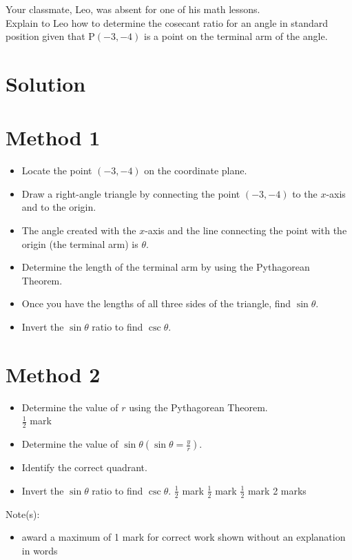 \documentclass[10pt]{article}
\begin{document}
Your classmate, Leo, was absent for one of his math lessons.\\
Explain to Leo how to determine the cosecant ratio for an angle in standard position given that $\mathrm{P}(-3,-4)$ is a point on the terminal arm of the angle.

\section*{Solution}
\section*{Method 1}
\begin{itemize}
  \item Locate the point $(-3,-4)$ on the coordinate plane.
  \item Draw a right-angle triangle by connecting the point $(-3,-4)$ to the $x$-axis and to the origin.
  \item The angle created with the $x$-axis and the line connecting the point with the origin (the terminal arm) is $\theta$.
  \item Determine the length of the terminal arm by using the Pythagorean Theorem.
  \item Once you have the lengths of all three sides of the triangle, find $\sin \theta$.
  \item Invert the $\sin \theta$ ratio to find $\csc \theta$.
\end{itemize}

\section*{Method 2}
\begin{itemize}
  \item Determine the value of $r$ using the Pythagorean Theorem.\\
$\frac{1}{2}$ mark
  \item Determine the value of $\sin \theta\left(\sin \theta=\frac{y}{r}\right)$.
  \item Identify the correct quadrant.
  \item Invert the $\sin \theta$ ratio to find $\csc \theta$. $\frac{1}{2}$ mark $\frac{1}{2}$ mark $\frac{1}{2}$ mark 2 marks
\end{itemize}

Note(s):

\begin{itemize}
  \item award a maximum of 1 mark for correct work shown without an explanation in words
\end{itemize}
\end{document}
